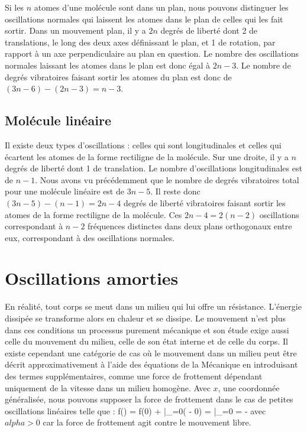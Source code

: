 Si les $n$ atomes d'une mol\'ecule sont dans un plan, nous pouvons distinguer les oscillations normales qui laissent les atomes dans le plan de celles qui les fait sortir. Dans un mouvement plan, il y a $2n$ degr\'es de libert\'e dont 2 de translations, le long des deux axes d\'efinissant le plan, et 1 de rotation, par rapport \`a un axe perpendiculaire au plan en question. Le nombre des oscillations normales laissant les atomes dans le plan est donc \'egal \`a $2n - 3$. Le nombre de degr\'es vibratoires faisant sortir les atomes du plan est donc de $(3n - 6) - (2n - 3) = n - 3$.

\subsection{Mol\'ecule lin\'eaire}

Il existe deux types d'oscillations : celles qui sont longitudinales et celles qui \'ecartent les atomes de la forme rectiligne de la mol\'ecule. Sur une droite, il y a $n$ degr\'es de libert\'e dont 1 de translation. Le nombre d'oscillations longitudinales est de $n - 1$. Nous avons vu pr\'ec\'edemment que le nombre de degr\'es vibratoires total pour une mol\'ecule lin\'eaire est de $3n - 5$. Il reste donc $(3n - 5) - (n - 1) = 2n - 4$ degr\'es de libert\'e vibratoires faisant sortir les atomes de la forme rectiligne de la mol\'ecule. Ces $2n - 4 = 2(n - 2)$ oscillations correspondant \`a $n - 2$ fr\'equences distinctes dans deux plans orthogonaux entre eux, correspondant \`a des oscillations normales.

\section{Oscillations amorties}

En r\'{e}alit\'{e}, tout corps se meut dans un milieu qui lui offre un r\'{e}sistance. L'\'{e}nergie dissip\'{e}e se transforme alors en chaleur et se dissipe. Le mouvement n'est plus dans ces conditions un processus purement m\'{e}canique et son \'{e}tude exige aussi celle du mouvement du milieu, celle de son \'{e}tat interne et de celle du corps. Il existe cependant une cat\'{e}gorie de cas o\`{u} le mouvement dans un milieu peut \^{e}tre d\'{e}crit approximativement \`{a} l'aide des \'{e}quations de la M\'{e}canique en introduisant des termes suppl\'{e}mentaires, comme une force de frottement d\'{e}pendant uniquement de la vitesse dans un milieu homog\`{e}ne. Avec $x$, une coordonn\'{e}e g\'{e}n\'{e}ralis\'{e}e, nous pouvons supposer la force de frottement dans le cas de petites oscillations lin\'{e}aires telle que :
\benn
	f() = f(0) + \bigg|_{=0}( - 0) = \bigg|_{=0} = -\alpha{}
\eenn
avec $alpha > 0$ car la force de frottement agit contre le mouvement libre.

